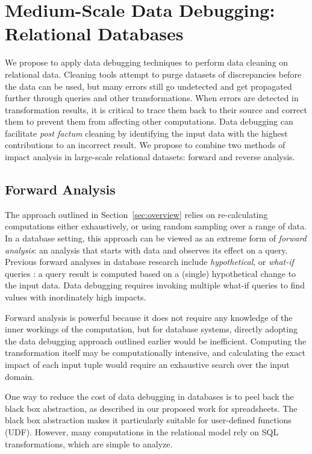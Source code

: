 \section{Medium-Scale Data Debugging: Relational Databases} %
\label{sec:bi_directional}

We propose to apply data debugging techniques to perform data cleaning
on relational data.  Cleaning tools attempt to purge datasets of
discrepancies before the data can be used, but many errors still go
undetected and get propagated further through queries and other
transformations. When errors are detected in transformation results,
it is critical to trace them back to their source and correct them to
prevent them from affecting other computations. Data debugging can
facilitate \emph{post factum} cleaning by identifying the input data
with the highest contributions to an incorrect result. We propose to
combine two methods of impact analysis in large-scale relational
datasets: forward and reverse analysis.

\subsection{Forward Analysis} %
\label{sub:forward_analysis}

The approach outlined in Section~\ref{sec:overview} relies on
re-calculating computations either exhaustively, or using random
sampling over a range of data. In a database setting, this approach
can be viewed as an extreme form of \emph{forward analysis}: an
analysis that starts with data and observes its effect on a
query. Previous forward analyses in database research include
\emph{hypothetical}, or \emph{what-if} queries
\cite{DBLP:conf/vldb/BalminPP00,DBLP:conf/icde/LakshmananRS08}: a
query result is computed based on a (single) hypothetical change to
the input data. Data debugging requires invoking multiple what-if
queries to find values with inordinately high impacts.

Forward analysis is powerful because it does not require any knowledge
of the inner workings of the computation, but for database systems,
directly adopting the data debugging approach outlined earlier would
be inefficient. Computing the transformation itself may be
computationally intensive, and calculating the exact impact of each
input tuple would require an exhaustive search over the input domain.

One way to reduce the cost of data debugging in databases is to peel
back the black box abstraction, as described in our proposed work for
spreadsheets.  The black box abstraction makes it particularly
suitable for user-defined functions (UDF). However, many computations
in the relational model rely on SQL transformations, which are simple
to analyze.

